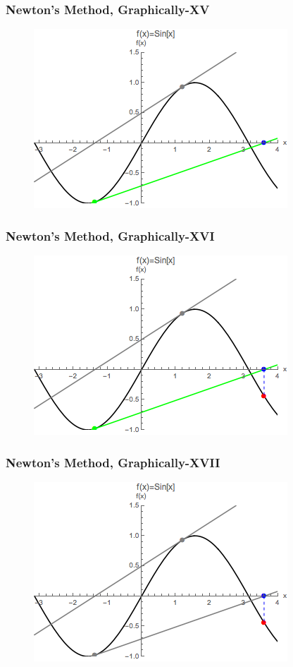 \documentclass{beamer}
\begin{document}
\begin{frame}
\frametitle[alignment=center]{Newton's Method, Graphically-XV}
\begin{figure}[htdb!]
\centering
\includegraphics[scale=0.8]{Newton_15.png}
\end{figure}
\end{frame}

\begin{frame}
\frametitle[alignment=center]{Newton's Method, Graphically-XVI}
\begin{figure}[htdb!]
\centering
\includegraphics[scale=0.8]{Newton_16.png}
\end{figure}
\end{frame}

\begin{frame}
\frametitle[alignment=center]{Newton's Method, Graphically-XVII}
\begin{figure}[htdb!]
\centering
\includegraphics[scale=0.8]{Newton_17.png}
\end{figure}
\end{frame}
\end{document}
